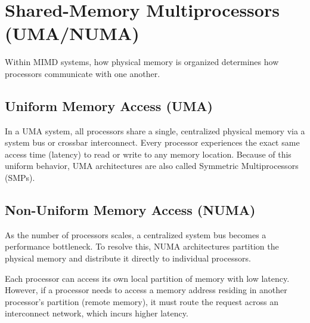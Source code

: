 \documentclass[12pt,a4paper,openany]{book}
\begin{document}
\section{Shared-Memory Multiprocessors (UMA/NUMA)}
Within MIMD systems, how physical memory is organized determines how processors communicate with one another.

\subsection{Uniform Memory Access (UMA)}
In a UMA system, all processors share a single, centralized physical memory via a system bus or crossbar interconnect. Every processor experiences the exact same access time (latency) to read or write to any memory location. Because of this uniform behavior, UMA architectures are also called Symmetric Multiprocessors (SMPs).
\subsection{Non-Uniform Memory Access (NUMA)}
As the number of processors scales, a centralized system bus becomes a performance bottleneck. To resolve this, NUMA architectures partition the physical memory and distribute it directly to individual processors.

Each processor can access its own local partition of memory with low latency. However, if a processor needs to access a memory address residing in another processor's partition (remote memory), it must route the request across an interconnect network, which incurs higher latency.
\end{document}
